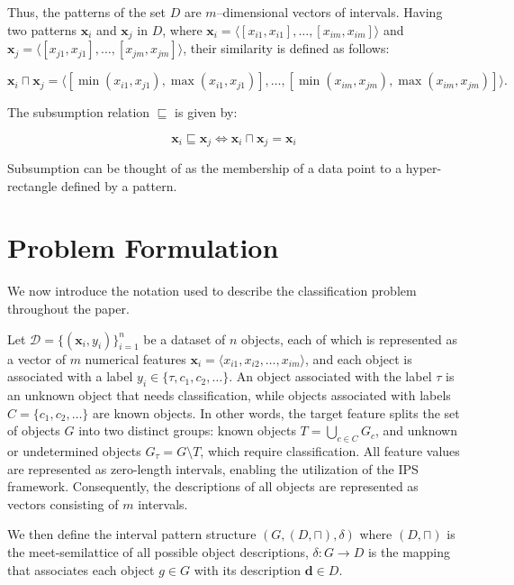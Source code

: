 \documentclass[a4paper,fleqn]{cas-sc}
\begin{document}
Thus, the patterns of the set $D$ are $m$--dimensional vectors of intervals. Having two patterns $\mathbf{x}_i$ and $\mathbf{x}_j$ in $D$, where
$\mathbf{x}_i=\langle [x_{i1},x_{i1}],\dots,[x_{im},x_{im}]\rangle$
and
$\mathbf{x}_j=\langle [x_{j1},x_{j1}],\dots,[x_{jm},x_{jm}]\rangle$,
their similarity is defined as follows:

\begin{equation}
    \mathbf{x}_i \sqcap \mathbf{x}_j =
    \langle
    [\min(x_{i1},x_{j1}), \max(x_{i1},x_{j1})],
    \dots,
    [\min(x_{im},x_{jm}), \max(x_{im},x_{jm})]
    \rangle .
\end{equation}

The subsumption relation $\sqsubseteq$ is given by:

\begin{equation}
    \mathbf{x}_i \sqsubseteq \mathbf{x}_j \Longleftrightarrow \mathbf{x}_i \sqcap \mathbf{x}_j = \mathbf{x}_i
\end{equation}

Subsumption can be thought of as the membership of a data point to a hyper-rectangle defined by a pattern.

\section{Problem Formulation}
We now introduce the notation used to describe the classification problem throughout the paper.

Let $\mathcal{D} = \{ (\mathbf{x}_i, y_i) \}_{i=1}^n$ be a dataset of $n$ objects, each of which is represented as a vector of $m$ numerical features $\mathbf{x}_i = \langle x_{i1}, x_{i2}, \ldots, x_{im} \rangle$, and each object is associated with a label $y_i \in \{\tau, c_1, c_2, \dots\}$. An object associated with the label $\tau$ is an unknown object that needs classification, while objects associated with labels $C = \{c_1, c_2, \dots\}$ are known objects. In other words, the target feature splits the set of objects $G$ into two distinct groups: known objects $T = \bigcup_{c \in C} G_c$, and unknown or undetermined objects $G_\tau= G \setminus T$, which require classification. All feature values are represented as zero-length intervals, enabling the utilization of the IPS framework. Consequently, the descriptions of all objects are represented as vectors consisting of $m$ intervals.


We then define the interval pattern structure $(G, (D, \sqcap), \delta)$ where $(D, \sqcap)$ is the meet-semilattice of all possible object descriptions, $\delta:G \rightarrow D$ is the mapping that associates each object $g \in G$ with its description $\mathbf{d} \in D$.
\end{document}
